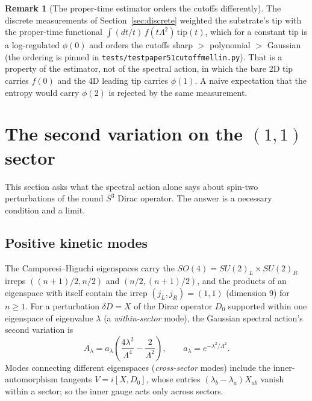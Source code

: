 \documentclass[11pt,a4paper]{article}
\theoremstyle{plain}
\theoremstyle{definition}
\newtheorem{remark}[theorem]{Remark}
\newcommand{\sthree}{S^{3}}
\renewcommand{\_}{\textunderscore\allowbreak}
\begin{document}
\begin{remark}[The proper-time estimator orders the cutoffs differently]
\label{cor:phi0_ratio}
The discrete measurements of Section~\ref{sec:discrete} weighted the
substrate's tip with the proper-time functional
$\int (dt/t)\, f(t\Lambda^2)\,\mathrm{tip}(t)$, which for a constant tip is
a log-regulated $\phi(0)$ and orders the cutoffs sharp $>$ polynomial $>$
Gaussian (the ordering is pinned in
\texttt{tests/test\_paper51\_cutoff\_mellin.py}). That is a property of the
estimator, not of the spectral action, in which the bare 2D tip carries
$f(0)$ and the 4D leading tip carries $\phi(1)$. A naive expectation that
the entropy would carry $\phi(2)$ is rejected by the same measurement.
\end{remark}

\section{The second variation on the $(1,1)$ sector}
\label{sec:fierz_pauli}

This section asks what the spectral action alone says about
spin-two perturbations of the round $\sthree$ Dirac operator. The answer is
a necessary condition and a limit.

\subsection{Positive kinetic modes}
\label{sec:g6}

The Camporesi--Higuchi eigenspaces carry the $SO(4) = SU(2)_L \times
SU(2)_R$ irreps $((n+1)/2, n/2)$ and $(n/2, (n+1)/2)$, and the products of
an eigenspace with itself contain the irrep $(j_L, j_R) = (1,1)$ (dimension
9) for $n \geq 1$. For a perturbation $\delta D = X$ of the Dirac operator
$D_0$ supported within one eigenspace of eigenvalue $\lambda$ (a
\emph{within-sector} mode), the Gaussian spectral action's second variation
is
\begin{equation}
  A_\lambda = a_\lambda\!\left(\frac{4 \lambda^2}{\Lambda^4} - \frac{2}{\Lambda^2}\right),
  \qquad a_\lambda = e^{-\lambda^2/\Lambda^2}.
\end{equation}
Modes connecting different eigenspaces (\emph{cross-sector} modes) include
the inner-automorphism tangents $V = i[X, D_0]$, whose entries
$(\lambda_b - \lambda_a) X_{ab}$ vanish within a sector; so the inner gauge
acts only across sectors.
\end{document}
